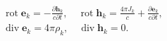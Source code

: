 \documentclass[10pt]{article}
\begin{document}
\[

\begin{gathered}

\operatorname{rot} \boldsymbol{e}_{k}=-\frac{\partial \boldsymbol{h}_{k}}{c \partial t}, \quad \operatorname{rot} \boldsymbol{h}_{k}=\frac{4 \pi J_{k}}{c}+\frac{\partial \boldsymbol{e}_{k}}{c \partial t}, \\

\operatorname{div} \boldsymbol{e}_{k}=4 \pi \rho_{k}, \quad \operatorname{div} \boldsymbol{h}_{k}=0 .

\end{gathered}

\]
\end{document}
